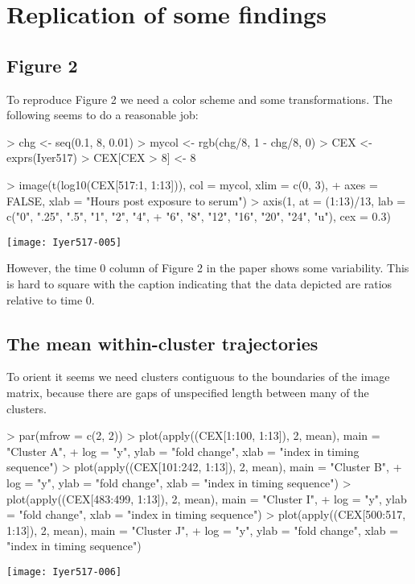 \documentclass[12pt]{article}
\begin{document}
\section{Replication of some findings}

\subsection{Figure 2}
To reproduce Figure 2 we need a color scheme and
some transformations.  The following seems
to do a reasonable job:

\begin{Schunk}
\begin{Sinput}
> chg <- seq(0.1, 8, 0.01)
> mycol <- rgb(chg/8, 1 - chg/8, 0)
> CEX <- exprs(Iyer517)
> CEX[CEX > 8] <- 8
\end{Sinput}
\end{Schunk}
\begin{center}
\begin{Schunk}
\begin{Sinput}
> image(t(log10(CEX[517:1, 1:13])), col = mycol, xlim = c(0, 3), 
+     axes = FALSE, xlab = "Hours post exposure to serum")
> axis(1, at = (1:13)/13, lab = c("0", ".25", ".5", "1", "2", "4", 
+     "6", "8", "12", "16", "20", "24", "u"), cex = 0.3)
\end{Sinput}
\end{Schunk}
\texttt{[image: Iyer517-005]}
\end{center}

However, the time 0 column of Figure 2 in the paper
shows some variability.  This is hard to square with the
caption indicating that the data depicted are ratios relative
to time 0.

\subsection{The mean within-cluster trajectories}
To orient it seems we need clusters contiguous to
the boundaries of the image matrix, because there are gaps
of unspecified length between many of the clusters.

\begin{Schunk}
\begin{Sinput}
> par(mfrow = c(2, 2))
> plot(apply((CEX[1:100, 1:13]), 2, mean), main = "Cluster A", 
+     log = "y", ylab = "fold change", xlab = "index in timing sequence")
> plot(apply((CEX[101:242, 1:13]), 2, mean), main = "Cluster B", 
+     log = "y", ylab = "fold change", xlab = "index in timing sequence")
> plot(apply((CEX[483:499, 1:13]), 2, mean), main = "Cluster I", 
+     log = "y", ylab = "fold change", xlab = "index in timing sequence")
> plot(apply((CEX[500:517, 1:13]), 2, mean), main = "Cluster J", 
+     log = "y", ylab = "fold change", xlab = "index in timing sequence")
\end{Sinput}
\end{Schunk}
\texttt{[image: Iyer517-006]}
\end{document}
